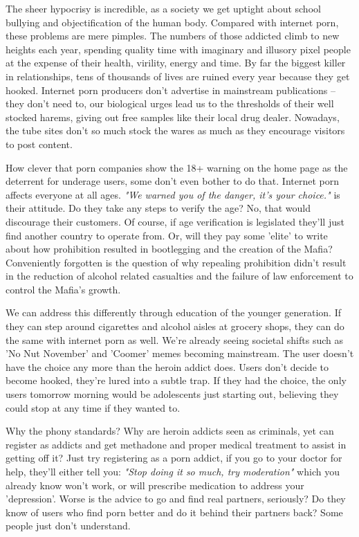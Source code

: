 \documentclass[easypeasy.tex]{subfiles}
\begin{document}
The sheer hypocrisy is incredible, as a society we get uptight about school bullying and objectification of the human body. Compared with internet porn, these problems are mere pimples. The numbers of those addicted climb to new heights each year, spending quality time with imaginary and illusory pixel people at the expense of their health, virility, energy and time. By far the biggest killer in relationships, tens of thousands of lives are ruined every year because they get hooked. Internet porn producers don't advertise in mainstream publications -- they don't need to, our biological urges lead us to the thresholds of their well stocked harems, giving out free samples like their local drug dealer. Nowadays, the tube sites don't so much stock the wares as much as they encourage visitors to post content.

How clever that porn companies show the 18+ warning on the home page as the deterrent for underage users, some don't even bother to do that. Internet porn affects everyone at all ages. \textit{"We warned you of the danger, it's your choice."} is their attitude. Do they take any steps to verify the age? No, that would discourage their customers. Of course, if age verification is legislated they'll just find another country to operate from. Or, will they pay some 'elite' to write about how prohibition resulted in bootlegging and the creation of the Mafia? Conveniently forgotten is the question of why repealing prohibition didn't result in the reduction of alcohol related casualties and the failure of law enforcement to control the Mafia's growth.

We can address this differently through education of the younger generation. If they can step around cigarettes and alcohol aisles at grocery shops, they can do the same with internet porn as well. We're already seeing societal shifts such as 'No Nut November' and 'Coomer' memes becoming mainstream. The user doesn't have the choice any more than the heroin addict does. Users don't decide to become hooked, they're lured into a subtle trap. If they had the choice, the only users tomorrow morning would be adolescents just starting out, believing they could stop at any time if they wanted to.

Why the phony standards? Why are heroin addicts seen as criminals, yet can register as addicts and get methadone and proper medical treatment to assist in getting off it? Just try registering as a porn addict, if you go to your doctor for help, they'll either tell you: \textit{"Stop doing it so much, try moderation"} which you already know won't work, or will prescribe medication to address your 'depression'. Worse is the advice to go and find real partners, seriously? Do they know of users who find porn better and do it behind their partners back? Some people just don't understand.
\end{document}
